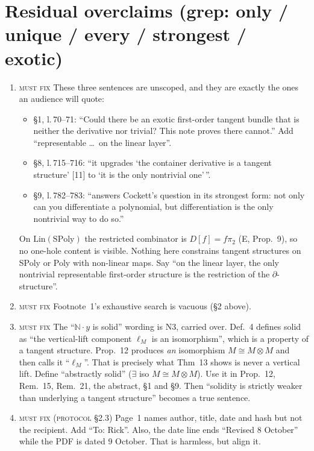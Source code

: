 \documentclass[11pt]{article}
\newcommand{\N}{\mathbb{N}}
\newcommand{\iss}[1]{\textsc{#1}}
\begin{document}
\section{Residual overclaims (grep: only / unique / every / strongest / exotic)}
\begin{enumerate}[label=\textbf{M\arabic*.},leftmargin=*]
\item \iss{must fix} These three sentences are unscoped, and they are exactly the ones an audience
will quote:
\begin{itemize}[leftmargin=1.2em]
\item \S1, l.\,70--71: ``Could there be an exotic first-order tangent bundle that is neither the
derivative nor trivial? This note proves there cannot.'' Add ``representable \dots\ on the linear
layer''.
\item \S8, l.\,715--716: ``it upgrades `the container derivative is a tangent structure' [11] to `it
is the only nontrivial one'\,''.
\item \S9, l.\,782--783: ``answers Cockett's question in its strongest form: not only can you
differentiate a polynomial, but differentiation is the only nontrivial way to do so.''
\end{itemize}
On $\mathrm{Lin}(\mathrm{SPoly})$ the restricted combinator is $D[f]=f\pi_2$ (E, Prop.~9), so no
one-hole content is visible. Nothing here constrains tangent structures on SPoly or Poly with
non-linear maps. Say ``on the linear layer, the only nontrivial representable first-order structure
is the restriction of the $\partial$-structure''.
\item \iss{must fix} Footnote~1's exhaustive search is vacuous (\S2 above).
\item \iss{must fix} The ``$\N\cdot y$ is solid'' wording is N3, carried over. Def.~4 defines solid as
``the vertical-lift component $\ell_M$ is an isomorphism'', which is a property of a tangent
structure. Prop.~12 produces \emph{an} isomorphism $M\cong M\otimes M$ and then calls it
``$\ell_M$''. That is precisely what Thm~13 shows is never a vertical lift. Define ``abstractly
solid'' ($\exists$ iso $M\cong M\otimes M$). Use it in Prop.~12, Rem.~15, Rem.~21, the abstract,
\S1 and \S9. Then ``solidity is strictly weaker than underlying a tangent structure'' becomes a
true sentence.
\item \iss{must fix (protocol \S2.3)} Page~1 names author, title, date and hash but not the
recipient. Add ``To: Rick''. Also, the date line ends ``Revised 8 October'' while the PDF is dated
9 October. That is harmless, but align it.
\end{enumerate}
\end{document}
